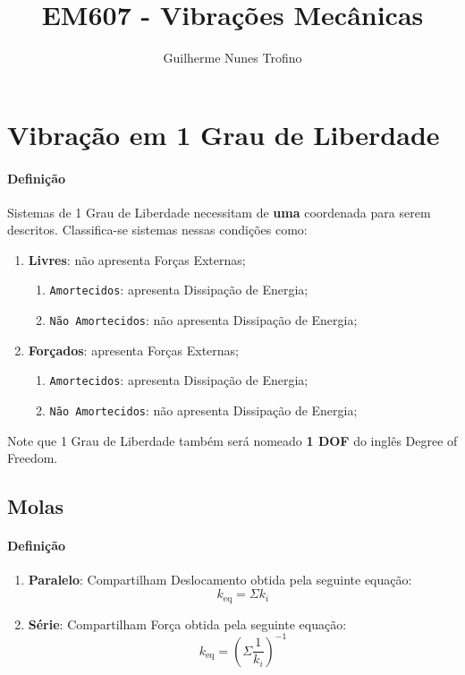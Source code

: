 \documentclass{article}
\title{EM607 - Vibrações Mecânicas}
\author{Guilherme Nunes Trofino}
\begin{document}
    \maketitle

\newpage\tableofcontents

\newpage\section{Vibração em 1 Grau de Liberdade}
    \paragraph{Definição}Sistemas de 1 Grau de Liberdade necessitam de \textbf{uma} coordenada para serem descritos. Classifica-se sistemas nessas condições como:
    \begin{enumerate}[rightmargin = \leftmargin]
        \item \textbf{Livres}: não apresenta Forças Externas;
        \begin{enumerate}[noitemsep]
            \item \texttt{Amortecidos}: apresenta Dissipação de Energia;
            \item \texttt{Não Amortecidos}: não apresenta Dissipação de Energia;
        \end{enumerate}

        \item \textbf{Forçados}: apresenta Forças Externas;
        \begin{enumerate}[noitemsep]
            \item \texttt{Amortecidos}: apresenta Dissipação de Energia;
            \item \texttt{Não Amortecidos}: não apresenta Dissipação de Energia;
        \end{enumerate}

    \end{enumerate}\noindent
    Note que 1 Grau de Liberdade também será nomeado \textbf{1 DOF} do inglês Degree of Freedom.

\subsection{Molas}
    \paragraph{Definição}
    \begin{enumerate}[rightmargin = \leftmargin]
        \item \textbf{Paralelo}: Compartilham Deslocamento obtida pela seguinte equação:
        \begin{equation}
            k_{\text{eq}} = \Sigma k_i
        \end{equation}

        \item \textbf{Série}: Compartilham Força obtida pela seguinte equação:
        \begin{equation}
            k_{\text{eq}} = \left( \Sigma \frac{1}{k_{i}} \right)^{-1}
        \end{equation}
    \end{enumerate}
\end{document}
